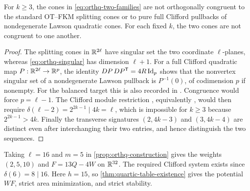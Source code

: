 \begin{proposition}
\label{prop:orthq-distinct}
For $k\ge3$, the cones in \eqref{eq:orthq-two-families} are not
orthogonally congruent to the standard OT--FKM splitting cones or
to pure full Clifford pullbacks of nondegenerate Lawson quadratic
cones. For each fixed $k$, the two cones are not congruent to one another.
\end{proposition}

\begin{proof}
The splitting cones in $\mathbb R^{2\ell}$ have singular set the two
coordinate $\ell$-planes, whereas \eqref{eq:orthq-singular} has
dimension $\ell+1$. For a full Clifford quadratic map
$P:\mathbb R^{2\ell}\to\mathbb R^p$, the identity
$DP\,DP^{\mathsf T}=4R\operatorname{Id}_p$ shows that the nonvertex singular
set of a nondegenerate Lawson pullback is $P^{-1}(0)$, of codimension
$p$ if nonempty. For the balanced target this is also recorded in
\cite[Remark~5.2.6(1)]{RiedlerThesis25}. Congruence would force $p=\ell-1$.
The Clifford module restriction
\cite[Section~3.5]{FKM81}, equivalently
\cite[Table~4.1]{RiedlerThesis25}, would then require \(\delta(\ell-2)=2^{2k-1}\mid4k=\ell\),
which is impossible for $k\ge3$ because $2^{2k-1}>4k$.
Finally the transverse signatures $(2,4k-3)$ and $(3,4k-4)$
are distinct even after interchanging their two entries, and hence
distinguish the two sequences.
\end{proof}

\begin{remark}
\label{ex:quartic-2510}
Taking $\ell=16$ and $m=5$ in \cref{prop:orthq-construction}
gives the weights $(2,5,10)$ and $F=13Q-4W$ on $\mathbb R^{32}$.
The required Clifford system exists since $\delta(6)=8\mid16$.
Here $h=15$, so \cref{thm:quartic-table-existence} gives the
potential $WF$, strict area minimization, and strict stability.
\end{remark}
